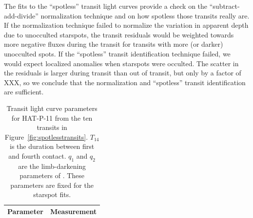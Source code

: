 \documentclass[iop]{emulateapj}
\begin{document}
The fits to the ``spotless'' transit light curves provide a check on the ``subtract-add-divide'' normalization technique and on how spotless those transits really are. If the normalization technique failed to normalize the variation in apparent depth due to unocculted starspots, the transit residuals would be weighted towards more negative fluxes during the transit for transits with more (or darker) unocculted spots. If the ``spotless'' transit identification technique failed, we would expect localized anomalies when starspots were occulted. The scatter in the residuals is larger during transit than out of transit, but only by a factor of XXX, so we conclude that the normalization and ``spotless'' transit identification are sufficient.


\begin{table}
\centering
\begin{tabular}{cc}
Parameter & Measurement\\ \hline

\hline
\end{tabular}
\caption{Transit light curve parameters for HAT-P-11 from the ten transits in Figure~\ref{fig:spotlesstransits}. $T_{14}$ is the duration between first and fourth contact. $q_1$ and $q_2$ are the limb-darkening parameters of \citet{Kipping2013}. These parameters are fixed for the starspot fits. }
\label{tab:transitprops}
\end{table}
\end{document}

